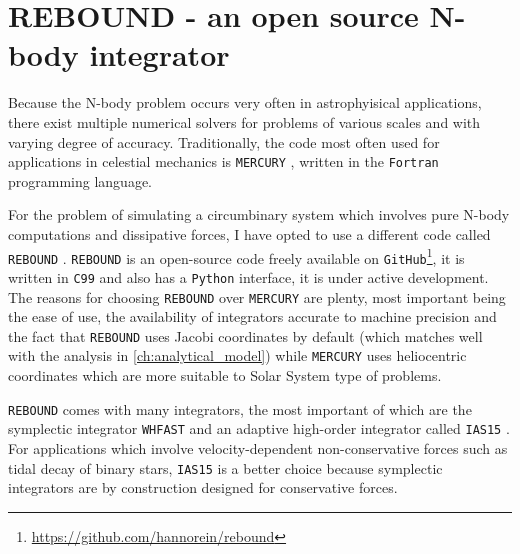 \documentclass[ twoside,openright,titlepage,numbers=noenddot,headinclude,%
                footinclude=true,cleardoublepage=empty,abstractoff, %
                BCOR=5mm,paper=a4,fontsize=11pt,%
                american,%
                ]{scrreprt}
\begin{document}
\section{REBOUND - an open source N-body integrator}
\label{sec:REBOUND - an open source N-body integrator}
Because the N-body problem occurs very often in astrophyisical applications,
there exist multiple numerical solvers for problems of various scales and 
with varying degree of accuracy. Traditionally, the code most often used for applications
in celestial mechanics is \texttt{MERCURY} \citep{chambers1997,chambers1999}, 
written in the \texttt{Fortran} programming language.

For the problem of simulating a circumbinary system
which involves pure N-body computations and dissipative forces, I have 
opted to use a different code called \texttt{REBOUND} \citep{Rein2012}.
\texttt{REBOUND} is an open-source code freely available on \texttt{GitHub}\footnote{
    \url{https://github.com/hannorein/rebound}}, it is written in \texttt{C99}
and also has a \texttt{Python} interface, it is under active development.
The reasons for choosing \texttt{REBOUND} over \texttt{MERCURY} are plenty,
most important being the ease of use, the availability of 
integrators accurate to machine precision  and the fact that 
\texttt{REBOUND} uses Jacobi coordinates
by default (which matches well with the analysis in \cref{ch:analytical_model})
while \texttt{MERCURY} uses heliocentric coordinates which are more suitable to
Solar System type of problems.

\texttt{REBOUND} comes with many integrators, the most important of which
are the symplectic integrator \texttt{WHFAST} \citep{Rein2015} and an
adaptive high-order integrator called \texttt{IAS15} \citep{Rein2014}. For
applications which involve velocity-dependent non-conservative forces
such as tidal decay of binary stars, \texttt{IAS15} is a better choice
because symplectic integrators are by construction
designed for conservative forces. 
\end{document}
